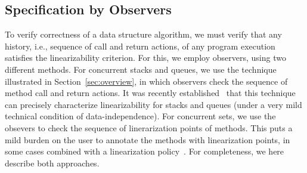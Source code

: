 





\subsection{Specification by Observers}
To verify correctness of a data structure algorithm,
we must verify that any history, i.e., sequence of call and return actions,
of any program execution satisfies the linearizability criterion.
For this, we employ observers, using two different methods.
For concurrent stacks and queues, we use the technique illustrated in
Section~\ref{sec:overview}, in which observers check the sequence of
method call and return actions.
It was recently established~\cite{BEEH:icalp15,HSV:concur13} that this
technique can precisely characterize linearizability for stacks and queues
(under a very mild technical condition of data-independence).
For concurrent sets, we use the obsevers to check the sequence of
linerarization points of methods. This puts a mild burden on the user to
annotate the methods with linearization points, in some cases
combined with a linearization policy~\cite{Quy:sas16}.
For completeness, we here describe both approaches.

